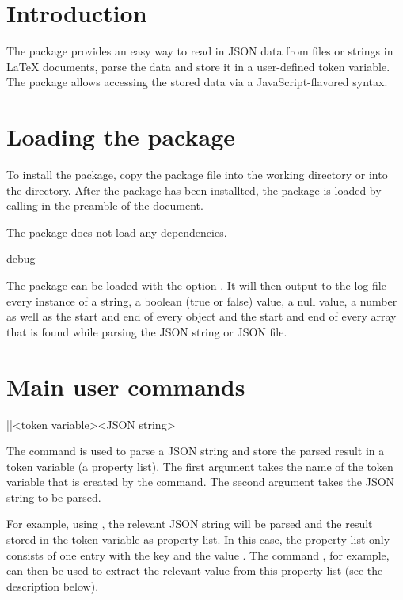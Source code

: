 \documentclass[a4paper]{article}
\begin{document}
\printdoctitle

\bigskip

\section{Introduction}

The  package provides an easy way to read in JSON data from files or strings in LaTeX documents, parse the data and store it in a user-defined token variable. The package allows accessing the stored data via a JavaScript-flavored syntax.

\section{Loading the package}

To install the package, copy the package file  into the working directory or into the  directory. After the package has been installted, the  package is loaded by calling \macro{\usepackage{jsonparse}} in the preamble of the document. 

The package does not load any dependencies.

\begin{macrodef}debug\end{macrodef}
The package can be loaded with the option . It will then output to the log file every instance of a string, a boolean (true or false) value, a null value, a number as well as the start and end of every object and the start and end of every array that is found while parsing the JSON string or JSON file.

\section{Main user commands}

\begin{macrodef}
|\JSONParse|{<token variable>}{<JSON string>}
\end{macrodef}
The command \macro{\JSONParse} is used to parse a JSON string and store the parsed result in a token variable (a property list). The first argument takes the name of the token variable that is created by the command. The second argument takes the JSON string to be parsed. 

For example, using , the relevant JSON string will be parsed and the result stored in the token variable \macro{\myJSONdata} as property list. In this case, the property list only consists of one entry with the key  and the value . The command , for example, can then be used to extract the relevant value from this property list (see the description below). 
\end{document}
